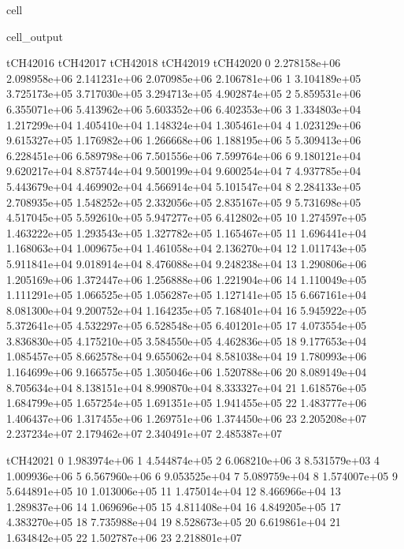 \documentclass[letterpaper,10pt,english]{jupyterBook}
\begin{document}
\begin{sphinxuseclass}{cell}
\begin{sphinxVerbatimOutput}
\begin{sphinxuseclass}{cell_output}
\begin{sphinxVerbatim}[commandchars=\\\{\}]
       tCH4\PYGZus{}2016     tCH4\PYGZus{}2017     tCH4\PYGZus{}2018     tCH4\PYGZus{}2019     tCH4\PYGZus{}2020  \PYGZbs{}
0   2.278158e+06  2.098958e+06  2.141231e+06  2.070985e+06  2.106781e+06   
1   3.104189e+05  3.725173e+05  3.717030e+05  3.294713e+05  4.902874e+05   
2   5.859531e+06  6.355071e+06  5.413962e+06  5.603352e+06  6.402353e+06   
3   1.334803e+04  1.217299e+04  1.405410e+04  1.148324e+04  1.305461e+04   
4   1.023129e+06  9.615327e+05  1.176982e+06  1.266668e+06  1.188195e+06   
5   5.309413e+06  6.228451e+06  6.589798e+06  7.501556e+06  7.599764e+06   
6   9.180121e+04  9.620217e+04  8.875744e+04  9.500199e+04  9.600254e+04   
7   4.937785e+04  5.443679e+04  4.469902e+04  4.566914e+04  5.101547e+04   
8   2.284133e+05  2.708935e+05  1.548252e+05  2.332056e+05  2.835167e+05   
9   5.731698e+05  4.517045e+05  5.592610e+05  5.947277e+05  6.412802e+05   
10  1.274597e+05  1.463222e+05  1.293543e+05  1.327782e+05  1.165467e+05   
11  1.696441e+04  1.168063e+04  1.009675e+04  1.461058e+04  2.136270e+04   
12  1.011743e+05  5.911841e+04  9.018914e+04  8.476088e+04  9.248238e+04   
13  1.290806e+06  1.205169e+06  1.372447e+06  1.256888e+06  1.221904e+06   
14  1.110049e+05  1.111291e+05  1.066525e+05  1.056287e+05  1.127141e+05   
15  6.667161e+04  8.081300e+04  9.200752e+04  1.164235e+05  7.168401e+04   
16  5.945922e+05  5.372641e+05  4.532297e+05  6.528548e+05  6.401201e+05   
17  4.073554e+05  3.836830e+05  4.175210e+05  3.584550e+05  4.462836e+05   
18  9.177653e+04  1.085457e+05  8.662578e+04  9.655062e+04  8.581038e+04   
19  1.780993e+06  1.164699e+06  9.166575e+05  1.305046e+06  1.520788e+06   
20  8.089149e+04  8.705634e+04  8.138151e+04  8.990870e+04  8.333327e+04   
21  1.618576e+05  1.684799e+05  1.657254e+05  1.691351e+05  1.941455e+05   
22  1.483777e+06  1.406437e+06  1.317455e+06  1.269751e+06  1.374450e+06   
23  2.205208e+07  2.237234e+07  2.179462e+07  2.340491e+07  2.485387e+07   

       tCH4\PYGZus{}2021  
0   1.983974e+06  
1   4.544874e+05  
2   6.068210e+06  
3   8.531579e+03  
4   1.009936e+06  
5   6.567960e+06  
6   9.053525e+04  
7   5.089759e+04  
8   1.574007e+05  
9   5.644891e+05  
10  1.013006e+05  
11  1.475014e+04  
12  8.466966e+04  
13  1.289837e+06  
14  1.069696e+05  
15  4.811408e+04  
16  4.849205e+05  
17  4.383270e+05  
18  7.735988e+04  
19  8.528673e+05  
20  6.619861e+04  
21  1.634842e+05  
22  1.502787e+06  
23  2.218801e+07  
\end{sphinxVerbatim}

\end{sphinxuseclass}\end{sphinxVerbatimOutput}

\end{sphinxuseclass}
\end{document}
